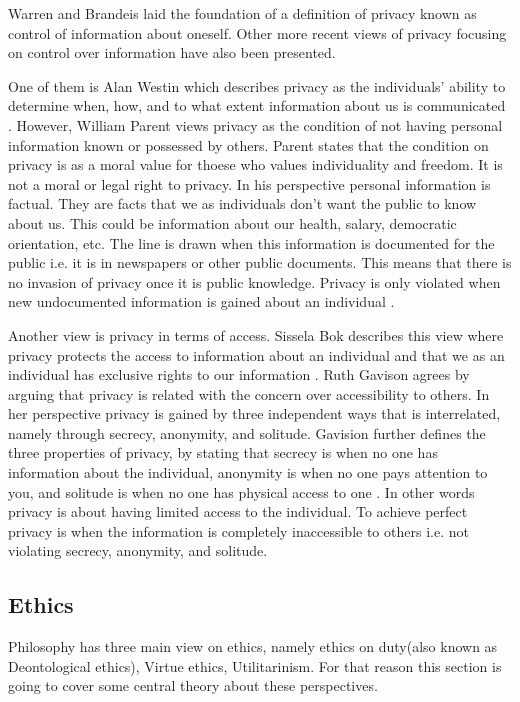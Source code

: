 Warren and Brandeis laid the foundation of a definition of privacy known as control of information about oneself. Other more recent views of privacy focusing on control over information have also been presented.

One of them is Alan Westin which describes privacy as the individuals' ability to determine when, how, and to what extent information about us is communicated \cite{westin:1969}.  
However, William Parent views privacy as the condition of not having personal information known or possessed by others. Parent states that the condition on privacy is as a moral value for thoese who values individuality and freedom. It is not a moral or legal right to privacy. In his perspective personal information is factual. They are facts that we as individuals don't want the public to know about us. This could be information about our health, salary, democratic orientation, etc. The line is drawn when this information is documented for the public i.e. it is in newspapers or other public documents. This means that there is no invasion of privacy once it is public knowledge. Privacy is only violated when new undocumented information is gained about an individual \cite{parent:1983}. 

Another view is privacy in terms of access. Sissela Bok describes this view where privacy protects the access to information about an individual and that we as an individual has exclusive rights to our information  \cite{bok:1982}. Ruth Gavison agrees by arguing that privacy is related with the concern over accessibility to others. In her perspective privacy is gained by three independent ways that is interrelated, namely through secrecy, anonymity, and solitude. Gavision further defines the three properties of privacy, by stating that secrecy is when no one has information about the individual, anonymity is when no one pays attention to you, and solitude is when no one has physical access to one \cite{gavison:1980}.  
In other words privacy is about having limited access to the individual. To achieve perfect privacy is when the information is completely inaccessible to others i.e. not violating secrecy, anonymity, and solitude. 

\subsection{Ethics}
Philosophy has three main view on ethics, namely ethics on duty(also known as Deontological ethics), Virtue ethics, Utilitarinism. For that reason this section is going to cover some central theory about these perspectives.

